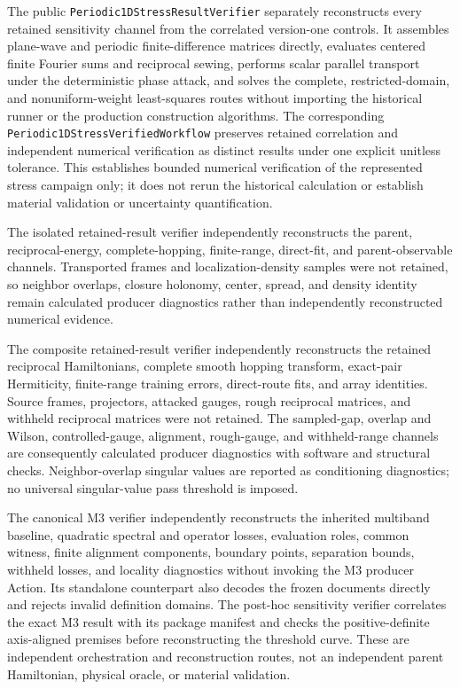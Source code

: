The public \texttt{Periodic1DStressResultVerifier} separately reconstructs every
retained sensitivity channel from the correlated version-one controls. It assembles
plane-wave and periodic finite-difference matrices directly, evaluates centered
finite Fourier sums and reciprocal sewing, performs scalar parallel transport under
the deterministic phase attack, and solves the complete, restricted-domain, and
nonuniform-weight least-squares routes without importing the historical runner or the
production construction algorithms. The corresponding
\texttt{Periodic1DStressVerifiedWorkflow} preserves retained correlation and
independent numerical verification as distinct results under one explicit unitless
tolerance. This establishes bounded numerical verification of the represented stress
campaign only; it does not rerun the historical calculation or establish material
validation or uncertainty quantification.

The isolated retained-result verifier independently reconstructs the parent,
reciprocal-energy, complete-hopping, finite-range, direct-fit, and parent-observable
channels. Transported frames and localization-density samples were not retained, so
neighbor overlaps, closure holonomy, center, spread, and density identity remain
calculated producer diagnostics rather than independently reconstructed numerical
evidence.

The composite retained-result verifier independently reconstructs the retained
reciprocal Hamiltonians, complete smooth hopping transform, exact-pair Hermiticity,
finite-range training errors, direct-route fits, and array identities. Source frames,
projectors, attacked gauges, rough reciprocal matrices, and withheld reciprocal
matrices were not retained. The sampled-gap, overlap and Wilson, controlled-gauge,
alignment, rough-gauge, and withheld-range channels are consequently calculated
producer diagnostics with software and structural checks. Neighbor-overlap singular
values are reported as conditioning diagnostics; no universal singular-value pass
threshold is imposed.

The canonical M3 verifier independently reconstructs the inherited multiband
baseline, quadratic spectral and operator losses, evaluation roles, common
witness, finite alignment components, boundary points, separation bounds,
withheld losses, and locality diagnostics without invoking the M3 producer
Action. Its standalone counterpart also decodes the frozen documents directly
and rejects invalid definition domains. The post-hoc sensitivity verifier
correlates the exact M3 result with its package manifest and checks the
positive-definite axis-aligned premises before reconstructing the threshold
curve. These are independent orchestration and reconstruction routes, not an
independent parent Hamiltonian, physical oracle, or material validation.

